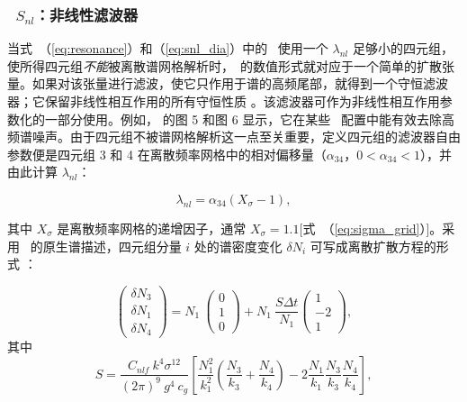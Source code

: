 \vsssub
\subsubsection{~$S_{nl}$：非线性滤波器} \label{sec:NLS}
\vsssub


\noindent
当式~（\ref{eq:resonance}）和（\ref{eq:snl_dia}）中的 \dia\ 使用一个 $\lambda_{nl}$ 足够小的四元组，使所得四元组\emph{不能}被离散谱网格解析时，\dia\ 的数值形式就对应于一个简单的扩散张量。如果对该张量进行滤波，使它只作用于谱的高频尾部，就得到一个守恒滤波器；它保留非线性相互作用的所有守恒性质 \citep{tol:MMAB08b,tol:OMOD11}。该滤波器可作为非线性相互作用参数化的一部分使用。例如，\cite{tol:OMOD11} 的图 5 和图 6 显示，它在某些 \gmd\ 配置中能有效去除高频谱噪声。由于四元组不被谱网格解析这一点至关重要，定义四元组的滤波器自由参数便是四元组 3 和 4 在离散频率网格中的相对偏移量（$\alpha_{34}$，$0 < \alpha_{34} < 1$），并由此计算 $\lambda_{nl}$：


\begin{equation}
\lambda_{nl} = \alpha_{34} (X_{\sigma}-1) , \label{eq:nls_a34}
\end{equation}

\noindent 
其中 $X_{\sigma}$ 是离散频率网格的递增因子，通常 $X_{\sigma}=1.1$[式~（\ref{eq:sigma_grid}）]。采用 \ws\ 的原生谱描述，四元组分量 $i$ 处的谱密度变化 $\delta N_i$ 可写成离散扩散方程的形式 \citep[第 294 页]{tol:OMOD11}：


\begin{equation}
\left ( \begin{array}{l} \delta N_3 \\ \delta N_1 \\ \delta N_4 
\end{array} \right ) = 
N_1 \: \left ( \begin{array}{c} 0 \\ 1 \\ 0 \end{array} \right ) +
N_1 \:  \frac{S \Delta t}{N_1}
\left ( \begin{array}{r} 1 \\ -2 \\ 1 \end{array} \right )
 , \label{eq:nls_dist}
\end{equation}
其中
\begin{equation}
S = \frac{C_{nlf} \: k^4 \sigma^{12} }{(2\pi)^9 \: g^4 \: c_g }
\left [ \frac{N_1^2}{k_1^2}  \left ( \frac{N_3}{k_3}+\frac{N_4}{k_4} \right ) 
               - 2 \frac{N_1}{k_1} \frac{N_3}{k_3} \frac{N_4}{k_4} \right ]
, \label{eq:nls_S}
\end{equation}

